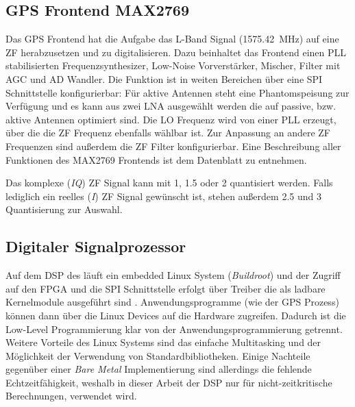 \subsection{GPS Frontend MAX2769}
\label{max2769frontend}
Das GPS Frontend hat die Aufgabe das L-Band Signal (\SI{1575.42}{\MHz}) auf eine \gls{ZF} herabzusetzen und zu digitalisieren. Dazu beinhaltet das Frontend einen PLL stabilisierten Frequenzsynthesizer, Low-Noise Vorverstärker, Mischer, Filter mit \gls{AGC} und AD Wandler. Die Funktion ist in weiten Bereichen über eine SPI Schnittstelle konfigurierbar: Für aktive Antennen steht eine Phantomspeisung zur Verfügung und es kann aus zwei \gls{LNA} ausgewählt werden die auf passive, bzw. aktive Antennen optimiert sind. Die \gls{LO} Frequenz wird von einer PLL erzeugt, über die die ZF Frequenz ebenfalls wählbar ist. Zur Anpassung an andere ZF Frequenzen sind außerdem die ZF Filter konfigurierbar. Eine Beschreibung aller Funktionen des MAX2769 Frontends ist dem Datenblatt \cite{max2769} zu entnehmen.

Das komplexe (\emph{IQ}) ZF Signal kann mit \SI{1}{\bit}, \SI{1.5}{\bit} oder \SI{2}{\bit}  quantisiert werden. Falls lediglich ein reelles (\emph{I}) ZF Signal gewünscht ist, stehen außerdem  \SI{2.5}{\bit} und \SI{3}{\bit} Quantisierung zur Auswahl.


\subsection{Digitaler Signalprozessor}
Auf dem \gls{DSP} des \comboard läuft ein embedded Linux System (\emph{Buildroot}) und der Zugriff auf den FPGA und die SPI Schnittstelle erfolgt über Treiber die als ladbare Kernelmodule ausgeführt sind . Anwendungsprogramme (wie der GPS Prozess) können dann über die Linux Devices auf die Hardware zugreifen. Dadurch ist die Low-Level Programmierung klar von der Anwendungsprogrammierung getrennt. Weitere Vorteile des Linux Systems sind das einfache Multitasking und der Möglichkeit der Verwendung von Standardbibliotheken. Einige Nachteile gegenüber einer \emph{Bare Metal} Implementierung sind allerdings die fehlende Echtzeitfähigkeit, weshalb in dieser Arbeit der DSP nur für nicht-zeitkritische Berechnungen, verwendet wird.


